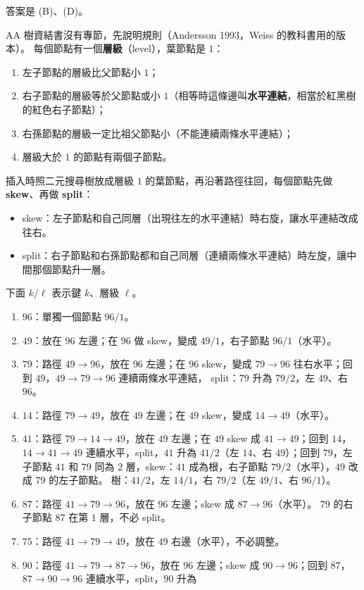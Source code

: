 \begin{pastsoln}
答案是 (B)、(D)。

AA 樹資結書沒有專節，先說明規則（Andersson 1993，Weiss 的教科書用的版本）。 每個節點有一個\textbf{層級}（level），葉節點是 $1$：
\begin{enumerate}
\item 左子節點的層級比父節點小 $1$；
\item 右子節點的層級等於父節點或小 $1$（相等時這條邊叫\textbf{水平連結}，相當於紅黑樹的紅色右子節點）；
\item 右孫節點的層級一定比祖父節點小（不能連續兩條水平連結）；
\item 層級大於 $1$ 的節點有兩個子節點。
\end{enumerate}
插入時照二元搜尋樹放成層級 $1$ 的葉節點，再沿著路徑往回，每個節點先做 \textbf{skew}、再做 \textbf{split}：
\begin{itemize}
\item skew：左子節點和自己同層（出現往左的水平連結）時右旋，讓水平連結改成往右。
\item split：右子節點和右孫節點都和自己同層（連續兩條水平連結）時左旋，讓中間那個節點升一層。
\end{itemize}
下面 $k/\ell$ 表示鍵 $k$、層級 $\ell$。
\begin{enumerate}
\item $96$：單獨一個節點 $96/1$。
\item $49$：放在 $96$ 左邊；在 $96$ 做 skew，變成 $49/1$，右子節點 $96/1$（水平）。
\item $79$：路徑 $49 \to 96$，放在 $96$ 左邊；在 $96$ skew，變成 $79 \to 96$ 往右水平；回到 $49$，$49 \to 79 \to 96$ 連續兩條水平連結，
split：$79$ 升為 $79/2$，左 $49$、右 $96$。
\item $14$：路徑 $79 \to 49$，放在 $49$ 左邊；在 $49$ skew，變成 $14 \to 49$（水平）。
\item $41$：路徑 $79 \to 14 \to 49$，放在 $49$ 左邊；在 $49$ skew 成 $41 \to 49$；回到 $14$，$14 \to 41 \to 49$ 連續水平，split，$41$ 升為
$41/2$（左 $14$、右 $49$）；回到 $79$，左子節點 $41$ 和 $79$ 同為 $2$ 層，skew：$41$ 成為根，右子節點 $79/2$（水平），$49$ 改成
$79$ 的左子節點。 樹：$41/2$，左 $14/1$，右 $79/2$（左 $49/1$、右 $96/1$）。
\item $87$：路徑 $41 \to 79 \to 96$，放在 $96$ 左邊；skew 成 $87 \to 96$（水平）。 $79$ 的右子節點 $87$ 在第 $1$ 層，不必 split。
\item $75$：路徑 $41 \to 79 \to 49$，放在 $49$ 右邊（水平），不必調整。
\item $90$：路徑 $41 \to 79 \to 87 \to 96$，放在 $96$ 左邊；skew 成 $90 \to 96$；回到 $87$，$87 \to 90 \to 96$ 連續水平，split，$90$ 升為

\end{enumerate}
\end{pastsoln}
